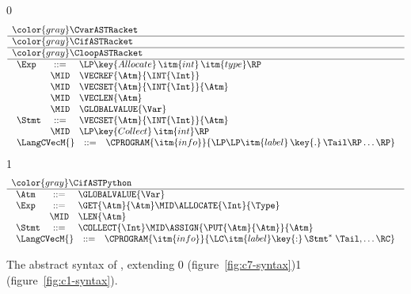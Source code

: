 \documentclass[7x10]{TimesAPriori_MIT}%
\newcommand{\gray}[1]{{\color{gray} #1}}
\def\racketEd{0}
\def\pythonEd{1}
\def\edition{1}
\newcommand{\racket}[1]{{\if\edition\racketEd{#1}\fi}}
\newcommand{\pythonColor}[0]{}
\newcommand{\python}[1]{{\if\edition\pythonEd\pythonColor #1\fi}}
\numberwithin{theorem}{chapter}
\numberwithin{definition}{chapter}
\numberwithin{equation}{chapter}
\begin{document}
\newcommand{\CtupASTRacket}{
\begin{array}{lcl}
\Exp &::= & \LP\key{Allocate} \,\itm{int}\,\itm{type}\RP \\
   &\MID& \VECREF{\Atm}{\INT{\Int}}  \\
   &\MID& \VECSET{\Atm}{\INT{\Int}}{\Atm} \\
   &\MID& \VECLEN{\Atm} \\
   &\MID& \GLOBALVALUE{\Var} \\
\Stmt &::=& \VECSET{\Atm}{\INT{\Int}}{\Atm} \\
    &\MID& \LP\key{Collect} \,\itm{int}\RP 
\end{array}
}
  
\newcommand{\CtupASTPython}{
\begin{array}{lcl}
\Atm &::=& \GLOBALVALUE{\Var} \\  
\Exp &::=& \GET{\Atm}{\Atm} \MID \ALLOCATE{\Int}{\Type} \\
      &\MID& \LEN{\Atm} \\
\Stmt &::=& \COLLECT{\Int} 
     \MID \ASSIGN{\PUT{\Atm}{\Atm}}{\Atm} 
\end{array}
}

\begin{figure}[tp]
  \begin{tcolorbox}[colback=white]
    \small
{\if\edition\racketEd    
\[
\begin{array}{l}
  \gray{\CvarASTRacket} \\ \hline
  \gray{\CifASTRacket} \\ \hline
  \gray{\CloopASTRacket} \\ \hline
  \CtupASTRacket \\
  \begin{array}{lcl}
    \LangCVecM{} & ::= & \CPROGRAM{\itm{info}}{\LP\LP\itm{label}\,\key{.}\,\Tail\RP\ldots\RP}
  \end{array}
\end{array}
\]
\fi}
{\if\edition\pythonEd\pythonColor
\[
\begin{array}{l}
  \gray{\CifASTPython} \\ \hline
  \CtupASTPython \\
\begin{array}{lcl}
\LangCVecM{} & ::= & \CPROGRAM{\itm{info}}{\LC\itm{label}\key{:}\,\Stmt^{*}\;\Tail, \ldots \RC}
\end{array}
\end{array}
\]
\fi}
  \end{tcolorbox}

\caption{The abstract syntax of \LangCVec{}, extending
  \racket{\LangCLoop{} (figure~\ref{fig:c7-syntax})}\python{\LangCIf{}
  (figure~\ref{fig:c1-syntax})}.}
\label{fig:c2-syntax}
\end{figure}
\end{document}
